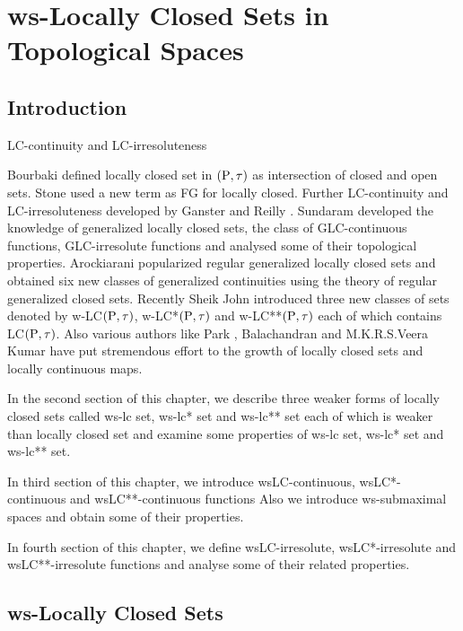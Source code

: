 \chapter{ws-Locally Closed Sets in Topological Spaces}
\graphicspath{{Chapter6/Chapter6Figs/EPS/}{Chapter6/Chapter6Figs/}}

\section{Introduction}\label{sec6.1}

LC-continuity and LC-irresoluteness

Bourbaki \cite{key17} defined locally closed set in $(\mathrm{P},\tau)$ as intersection of closed and open sets. Stone \cite{key87} used a new term as FG for locally closed. Further LC-continuity and LC-irresoluteness developed by Ganster and Reilly \cite{key37} . Sundaram \cite{key89} developed the knowledge of generalized locally closed sets, the class of GLC-continuous functions, GLC-irresolute functions and analysed some of their topological properties. Arockiarani \cite{key4} popularized regular generalized locally closed sets and obtained six new classes of generalized continuities using the theory of regular generalized closed sets. Recently Sheik John \cite{key83} introduced three new classes of sets denoted by w-LC$(\mathrm{P}, \tau)$, w-LC{*}$(\mathrm{P}, \tau)$ and w-LC{*}{*}$(\mathrm{P}, \tau)$ each of which contains LC$(\mathrm{P}, \tau)$. Also various authors like Park \cite{key75}, Balachandran \cite{key11} and M.K.R.S.Veera Kumar \cite{key92} have put stremendous effort to the growth of locally closed sets and locally continuous maps.

In the second section of this chapter, we describe three weaker forms of locally closed sets called ws-lc set, ws-lc* set and ws-lc{*}{*} set each of which is weaker than locally closed set and examine some properties of ws-lc set, ws-lc* set and ws-lc{*}{*} set. 

\newpage

In third section of this chapter, we introduce wsLC-continuous, wsLC*-continuous and wsLC{*}{*}-continuous functions Also we introduce ws-submaximal spaces and obtain some of their properties.

In fourth section of this chapter, we define wsLC-irresolute, wsLC*-irresolute and wsLC**-irresolute functions and analyse some of their related properties.

\section{ws-Locally Closed Sets}\label{sec6.2}

